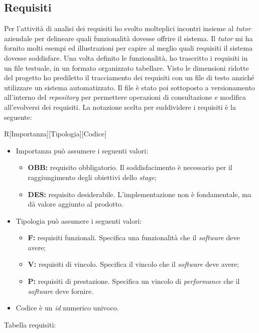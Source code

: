 \subsection{Requisiti}
Per l'attività di analisi dei requisiti ho svolto molteplici incontri insieme al \emph{tutor} aziendale per delineare quali funzionalità dovesse offrire il sistema. Il \emph{tutor} mi ha fornito molti esempi ed illustrazioni per capire al meglio quali requisiti il sistema dovesse soddisfare. Una volta definito le funzionalità, ho trascritto i requisiti in un file testuale, in un formato organizzato tabellare. Visto le dimensioni ridotte del progetto ho prediletto il tracciamento dei requisiti con un file di testo anziché utilizzare un sistema automatizzato. Il file è stato poi sottoposto a versionamento all'interno del \emph{repository} per permettere operazioni di consultazione e modifica all'evolversi dei requisiti. La notazione scelta per suddividere i requisiti è la seguente: 
\begin{center}
R[Importanza][Tipologia][Codice]
\end{center}
\begin{itemize}
\item Importanza può assumere i seguenti valori:
\begin{itemize}
\item \textbf{OBB:} requisito obbligatorio. Il soddisfacimento è necessario per il raggiungimento degli obiettivi dello \emph{stage};
\item \textbf{DES:} requisito desiderabile. L'implementazione non è fondamentale, ma dà valore aggiunto al prodotto.
\end{itemize}
\item Tipologia può assumere i seguenti valori:
\begin{itemize}
\item \textbf{F:} requisiti funzionali. Specifica una funzionalità che il \emph{software} deve avere;
\item \textbf{V:} requisiti di vincolo. Specifica il vincolo che il \emph{software} deve avere;
\item \textbf{P:} requisiti di prestazione. Specifica un vincolo di \emph{performance} che il \emph{software} deve fornire.
\end{itemize}
\item Codice è un \emph{id} numerico univoco.
\end{itemize}
\newpage
Tabella requisiti:
\def\arraystretch{1.8}
